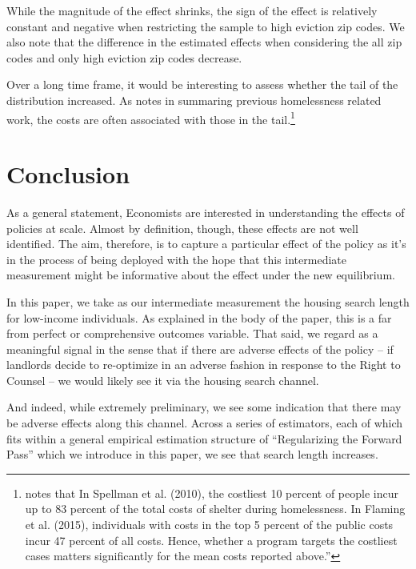 \documentclass[a4paper,12pt]{article}
\begin{document}
While the magnitude of the effect shrinks, the sign of the effect is relatively constant and negative when restricting the sample to high eviction zip codes. We also note that the difference in the estimated effects when considering the all zip codes and only high eviction zip codes decrease. \par 
Over a long time frame, it would be interesting to assess whether the tail of the distribution increased. As \cite{evans2019reducing} notes in summaring previous homelessness related work, the costs are often associated with those in the tail.\footnote{\cite{evans2019reducing} notes that In Spellman et al. (2010), the costliest 10 percent of people incur up to 83 percent of the total costs of shelter
during homelessness. In Flaming et al. (2015), individuals with costs in the top 5 percent of the public costs
incur 47 percent of all costs. Hence, whether a program targets the costliest cases matters significantly for the
mean costs reported above.''}




 
\section{Conclusion}
As a general statement, Economists are interested in understanding the effects of policies at scale. Almost by definition, though, these effects are not well identified. The aim, therefore, is to capture a particular effect of the policy as it's in the process of being deployed with the hope that this intermediate measurement might be informative about the effect under the new equilibrium.\par 
In this paper, we take as our intermediate measurement the housing search length for low-income individuals. As explained in the body of the paper, this is a far from perfect or comprehensive outcomes variable. That said, we regard as a meaningful signal in the sense that if there are adverse effects of the policy -- if landlords decide to re-optimize in an adverse fashion in response to the Right to Counsel -- we would likely see it via the housing search channel. \par 
And indeed, while extremely preliminary, we see some indication that there may be adverse effects along this channel. Across a series of estimators, each of which fits within a general empirical estimation structure of ``Regularizing the Forward Pass'' which we introduce in this paper, we see that search length increases.
\end{document}
